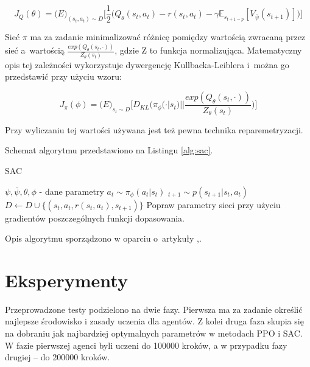 \documentclass[a4paper,12pt]{article}
\let\oldsection\section
\renewcommand\section{\clearpage\oldsection}
\begin{document}
\begin{equation}
	J_Q(\theta) = \mathbb(E)_{(s_t,a_t) \sim D}\Big[
		\frac{1}{2} \big(
			Q_\theta(s_t,a_t) - r(s_t,a_t) - \gamma \mathbb{E}_{s_{t+1 \sim p}}[V_{\bar{\psi}}(s_{t+1})]
		\big)
	\Big]
\end{equation}

Sieć $\pi$ ma za zadanie minimalizować różnicę pomiędzy wartością zwracaną przez sieć  a~wartością $\frac{exp(Q_\theta(s_t,\cdot))}{Z_\theta(s_t)}$, gdzie Z to funkcja normalizująca. Matematyczny opis tej zależności wykorzystuje dywergencję Kullbacka-Leiblera i~można go przedstawić przy użyciu wzoru:

\begin{equation}
	J_\pi(\phi) = \mathbb(E)_{s_t \sim D}\Big[ D_{KL} \big(\pi_\phi(\cdot|s_t) || \frac{exp(Q_\theta(s_t,\cdot))}{Z_\theta(s_t)}  \big) \Big]
\end{equation}

Przy wyliczaniu tej wartości używana jest też pewna technika reparemetryzacji.



Schemat algorytmu przedstawiono na Listingu \ref{alg:sac}.
\begin{algorithm}[h!]
	\caption{SAC}
	\label{alg:sac}
	\begin{algorithmic}[1]
		\STATE $\psi, \bar{\psi}, \theta,\phi$ - dane parametry
				\STATE $a_t \sim \pi_{\phi}(a_t|s_t)$
				\STATE $_{t+1} \sim p(s_{t+1}|s_t,a_t)$
				\STATE $D \gets D \cup \{(s_t,a_t,r(s_t,a_t),s_{t+1})\}$
			\ENDFOR
		\ENDFOR
		\STATE Popraw parametry sieci przy użyciu gradientów poszczególnych funkcji dopasowania.
	\end{algorithmic}
\end{algorithm}

Opis algorytmu sporządzono w oparciu o~artykuły \cite{kumar},\cite{nieznany}.

\section{Eksperymenty}
Przeprowadzone testy podzielono na dwie fazy. Pierwsza ma za zadanie określić najlepsze środowisko i zasady uczenia dla agentów. Z kolei druga faza skupia się na dobraniu jak najbardziej optymalnych parametrów w metodach PPO i SAC. W fazie pierwszej agenci byli uczeni do 100000 kroków, a w przypadku fazy drugiej -- do 200000 kroków.
\end{document}
